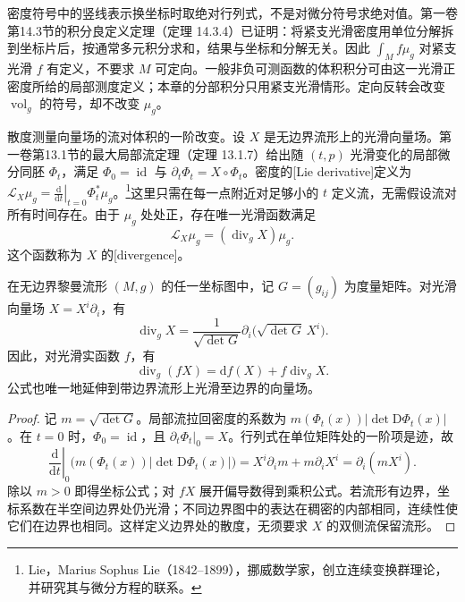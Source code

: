 
密度符号中的竖线表示换坐标时取绝对行列式，不是对微分符号求绝对值。第一卷第14.3节的积分良定义定理（定理 14.3.4）已证明：将紧支光滑密度用单位分解拆到坐标片后，按通常多元积分求和，结果与坐标和分解无关。因此 \(\int_M f\mu_g\) 对紧支光滑 \(f\) 有定义，不要求 \(M\) 可定向。一般非负可测函数的体积积分可由这一光滑正密度所给的局部测度定义；本章的分部积分只用紧支光滑情形。定向反转会改变 \(\operatorname{vol}_g\) 的符号，却不改变 \(\mu_g\)。

\ProseParagraphBreak

散度测量向量场的流对体积的一阶改变。设 \(X\) 是无边界流形上的光滑向量场。第一卷第13.1节的最大局部流定理（定理 13.1.7）给出随 \((t,p)\) 光滑变化的局部微分同胚 \(\Phi_t\)，满足 \(\Phi_0=\operatorname{id}\) 与 \(\partial_t\Phi_t=X\circ\Phi_t\)。密度的[Lie derivative]定义为 \(\mathcal L_X\mu_g=\left.\frac{\mathrm{d}}{\mathrm{d}t}\right|_{t=0}\Phi_t^*\mu_g\)。\footnote{Lie，Marius Sophus Lie（1842--1899），挪威数学家，创立连续变换群理论，并研究其与微分方程的联系。}这里只需在每一点附近对足够小的 \(t\) 定义流，无需假设流对所有时间存在。由于 \(\mu_g\) 处处正，存在唯一光滑函数满足
\begin{equation}
	\label{g3:eq:divergence-definition}
	\mathcal L_X\mu_g=(\operatorname{div}_gX)\mu_g.
\end{equation}
这个函数称为 \(X\) 的[divergence]。

\begin{proposition}
	\label{g3:prop:divergence-coordinate}
	在无边界黎曼流形 \((M,g)\) 的任一坐标图中，记 \(G=(g_{ij})\) 为度量矩阵。对光滑向量场 \(X=X^i\partial_i\)，有
	\begin{equation}
		\label{g3:eq:divergence-coordinate}
		\operatorname{div}_gX
		=\frac1{\sqrt{\det G}}\partial_i\bigl(\sqrt{\det G}\,X^i\bigr).
	\end{equation}
	因此，对光滑实函数 \(f\)，有
	\begin{equation}
		\label{g3:eq:divergence-product}
		\operatorname{div}_g(fX)=\mathrm{d}f(X)+f\operatorname{div}_gX.
	\end{equation}
	公式也唯一地延伸到带边界流形上光滑至边界的向量场。
\end{proposition}
\begin{proof}
	记 \(m=\sqrt{\det G}\)。局部流拉回密度的系数为 \(m(\Phi_t(x))|\det\mathrm{D}\Phi_t(x)|\)。在 \(t=0\) 时，\(\Phi_0=\operatorname{id}\)，且 \(\left.\partial_t\Phi_t\right|_0=X\)。行列式在单位矩阵处的一阶项是迹，故
	\[
		\left.\frac{\mathrm{d}}{\mathrm{d}t}\right|_0
		\bigl(m(\Phi_t(x))|\det\mathrm{D}\Phi_t(x)|\bigr)
		=X^i\partial_i m+m\partial_iX^i=\partial_i(mX^i).
	\]
	除以 \(m>0\) 即得坐标公式；对 \(fX\) 展开偏导数得到乘积公式。若流形有边界，坐标系数在半空间边界处仍光滑；不同边界图中的表达在稠密的内部相同，连续性使它们在边界也相同。这样定义边界处的散度，无须要求 \(X\) 的双侧流保留流形。
\end{proof}

